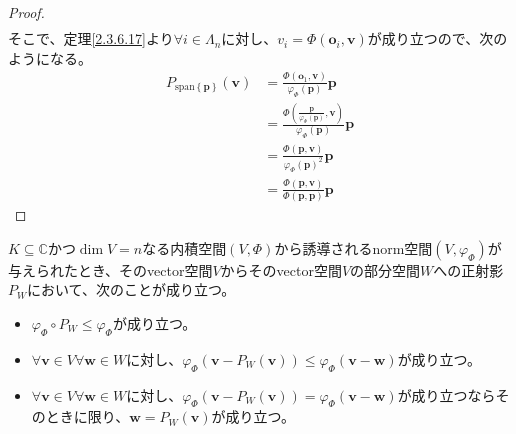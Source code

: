 \documentclass[dvipdfmx]{jsarticle}
\begin{document}
\begin{proof}
\begin{align*}
\end{align*}
そこで、定理\ref{2.3.6.17}より$\forall i \in \varLambda_{n}$に対し、$v_{i} = \varPhi \left( \mathbf{o}_{i},\mathbf{v} \right)$が成り立つので、次のようになる。
\begin{align*}
P_{\mathrm{span}\left\{ \mathbf{p} \right\}}\left( \mathbf{v} \right) &= \frac{\varPhi \left( \mathbf{o}_{1},\mathbf{v} \right)}{\varphi_{\varPhi }\left( \mathbf{p} \right)}\mathbf{p}\\
&= \frac{\varPhi \left( \frac{\mathbf{p}}{\varphi_{\varPhi }\left( \mathbf{p} \right)},\mathbf{v} \right)}{\varphi_{\varPhi }\left( \mathbf{p} \right)}\mathbf{p}\\
&= \frac{\varPhi \left( \mathbf{p},\mathbf{v} \right)}{{\varphi_{\varPhi }\left( \mathbf{p} \right)}^{2}}\mathbf{p}\\
&= \frac{\varPhi \left( \mathbf{p},\mathbf{v} \right)}{\varPhi \left( \mathbf{p},\mathbf{p} \right)}\mathbf{p}
\end{align*}
\end{proof}
\begin{thm}\label{2.3.7.16}
$K \subseteq \mathbb{C}$かつ$\dim V = n$なる内積空間$(V,\varPhi )$から誘導されるnorm空間$\left( V,\varphi_{\varPhi } \right)$が与えられたとき、そのvector空間$V$からそのvector空間$V$の部分空間$W$への正射影$P_{W}$において、次のことが成り立つ。
\begin{itemize}
\item
  $\varphi_{\varPhi } \circ P_{W} \leq \varphi_{\varPhi }$が成り立つ。
\item
  $\forall\mathbf{v} \in V\forall\mathbf{w} \in W$に対し、$\varphi_{\varPhi }\left( \mathbf{v} - P_{W}\left( \mathbf{v} \right) \right) \leq \varphi_{\varPhi }\left( \mathbf{v} - \mathbf{w} \right)$が成り立つ。
\item
  $\forall\mathbf{v} \in V\forall\mathbf{w} \in W$に対し、$\varphi_{\varPhi }\left( \mathbf{v} - P_{W}\left( \mathbf{v} \right) \right) = \varphi_{\varPhi }\left( \mathbf{v} - \mathbf{w} \right)$が成り立つならそのときに限り、$\mathbf{w} = P_{W}\left( \mathbf{v} \right)$が成り立つ。
\end{itemize}
\end{thm}
\end{document}
